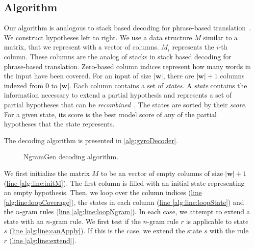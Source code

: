\subsection{Algorithm}

Our algorithm is analogous to stack based decoding
for phrase-based translation~\citep{koehn:2010:book}.
We construct hypotheses left to right.
We use a data structure $M$ similar to a matrix, that we represent
with a vector of columns. $M_i$ represents the $i$-th column.
These columns are the analog of stacks
in stack based decoding for phrase-based translation. Zero-based
column indices represent how many words in the input have
been covered. For an input of size $|\bm{w}|$, there are
$|\bm{w}| + 1$ columns indexed from $0$ to $|\bm{w}|$.
Each column contains a set of \emph{states}.
A \emph{state} contains the information necessary to
extend a partial hypothesis and represents a set of
partial hypotheses that can be \emph{recombined}~\citep{koehn:2010:book}.
The states are sorted by their \emph{score}.
For a given state, its score is the best model score of any of the partial
hypotheses that the state represents.

The decoding algorithm is presented in \autoref{alg:gyroDecoder}.
%
\begin{figure}
  \begin{algorithmic}[1]
       \hypertarget{alg:line:initM}{} \label{alg:line:initM}
       \hypertarget{alg:line:loopCoverage}{} \label{alg:line:loopCoverage}
         \hypertarget{alg:line:loopState}{} \label{alg:line:loopState}
           \hypertarget{alg:line:loopNgram}{} \label{alg:line:loopNgram}
             \hypertarget{alg:line:canApply}{} \label{alg:line:canApply}
               \hypertarget{alg:line:extend}{} \label{alg:line:extend}
            \EndIf
          \EndFor
        \EndFor
      \EndFor
    \EndFunction
  \end{algorithmic}
  \caption{NgramGen decoding algorithm.}
  \label{alg:gyroDecoder}
\end{figure}
%
We first initialize the matrix $M$ to be an vector of empty
columns of size $|\bm{w}| + 1$ (\hyperlink{alg:line:initM}{line \ref{alg:line:initM}}).
The first column is filled with an initial state representing an empty hypothesis.
Then, we loop over the column indices
(\hyperlink{alg:line:initM}{line \ref{alg:line:loopCoverage}}), the states in each
column (\hyperlink{alg:line:loopState}{line \ref{alg:line:loopState}}) and the
$n$-gram rules (\hyperlink{alg:line:loopNgram}{line \ref{alg:line:loopNgram}}).
In each case, we attempt to extend a state with an $n$-gram rule. We first test
if the $n$-gram rule $r$ is applicable to state $s$
(\hyperlink{alg:line:canApply}{line \ref{alg:line:canApply}}). If this
is the case, we extend the state $s$ with the rule $r$
(\hyperlink{alg:line:extend}{line \ref{alg:line:extend}}).

